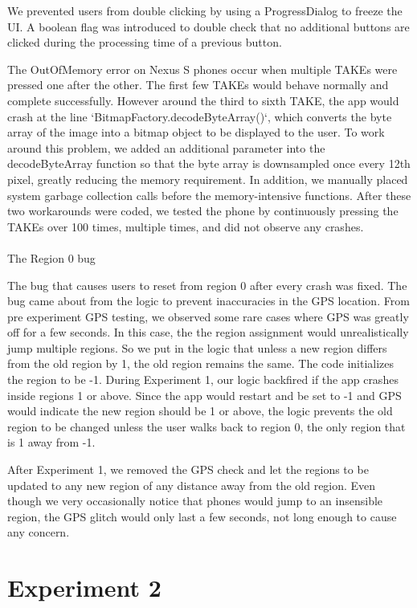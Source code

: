 We prevented users from double clicking by using a ProgressDialog to freeze the UI. A boolean flag was introduced to double check that no additional buttons are clicked during the processing time of a previous button.

The OutOfMemory error on Nexus S phones occur when multiple TAKEs were pressed one after the other. The first few TAKEs would behave normally and complete successfully. However around the third to sixth TAKE, the app would crash at the line `BitmapFactory.decodeByteArray()`, which converts the byte array of the image into a bitmap object to be displayed to the user.  To work around this problem, we added an additional parameter into the decodeByteArray function so that the byte array is downsampled once every 12th pixel, greatly reducing the memory requirement. In addition, we manually placed system garbage collection calls before the memory-intensive functions. After these two workarounds were coded, we tested the phone by continuously pressing the TAKEs over 100 times, multiple times, and did not observe any crashes.
\\
\\
The Region 0 bug

The bug that causes users to reset from region 0 after every crash was fixed. The bug came about from the logic to prevent inaccuracies in the GPS location. From pre experiment GPS testing, we observed some rare cases where GPS was greatly off for a few seconds. In this case, the the region assignment would unrealistically jump multiple regions. So we put in the logic that unless a new region differs from the old region by 1, the old region remains the same. The code initializes the region to be -1. During Experiment 1, our logic backfired if the app crashes inside regions 1 or above. Since the app would restart and be set to -1 and GPS would indicate the new region should be 1 or above, the logic prevents the old region to be changed unless the user walks back to region 0, the only region that is 1 away from -1.

After Experiment 1, we removed the GPS check and let the regions to be updated to any new region of any distance away from the old region. Even though we very occasionally notice that phones would jump to an insensible region, the GPS glitch would only last a few seconds, not long enough to cause any concern.

\section{Experiment 2}

